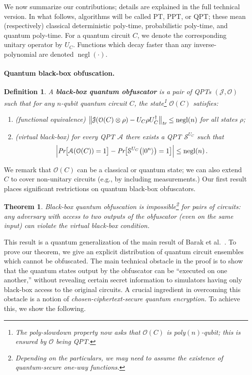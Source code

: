 \documentclass[11pt]{article}
\numberwithin{equation}{section}
\newtheorem{theorem}{Theorem}
\newtheorem{definition}{Definition}
\newcommand{\opn}{\operatorname}
\newcommand{\algo}{\mathcal}
\newcommand{\negl}{\opn{negl}}
\begin{document}
{We now summarize our contributions; details are explained in the full technical version. In what follows, algorithms will be called PT, PPT, or QPT; these mean (respectively) classical deterministic poly-time, probabilistic poly-time, and quantum poly-time. For a quantum circuit $C$, we denote the corresponding unitary operator by $U_C$. Functions which decay faster than any inverse-polynomial are denoted $\negl(\cdot)$.

\paragraph{Quantum black-box obfuscation.} 

\begin{definition}\label{def:vbb-obfuscator}
A \textbf{black-box quantum obfuscator} is a pair of QPTs $(\algo J, \algo O)$ such that for any $n$-qubit quantum circuit $C$, the state\footnote{The poly-slowdown property now asks that $\mathcal O(C)$ is poly$(n)$-qubit; this is ensured by $\algo O$ being QPT.} $\mathcal O(C)$ satisfies:
\begin{enumerate}
\item (functional equivalence) $\bigl\| \algo J ( \algo O(C) \otimes \rho ) - U_C \rho U_C^\dagger \bigr\|_\emph{tr} \leq \negl(n)$ for all states $\rho$;
\item (virtual black-box) for every QPT $\mathcal A$ there exists a QPT $\mathcal S^{U_C}$ such that
$$
\Bigl| \emph{Pr}\bigl[\mathcal A(\mathcal O(C)) = 1\bigr] - \emph{Pr}\bigl[\mathcal S^{U_C}\bigl(\ket{0^n}\bigr) = 1\bigr] \Bigr| \leq \negl(n)\,.
$$
\end{enumerate}
\end{definition}
\noindent We remark that $\algo O(C)$ can be a classical or quantum state; we can also extend $C$ to cover non-unitary circuits (e.g., by including measurements.) Our first result places significant restrictions on quantum black-box obfuscators.

\begin{theorem}\label{thm:main}
Black-box quantum obfuscation is impossible\footnote{Depending on the particulars, we may need to assume the existence of quantum-secure one-way functions.} for pairs of circuits: any adversary with access to two outputs of the obfuscator (even on the same input) can violate the virtual black-box condition.
\end{theorem}

\noindent This result is a quantum generalization of the main result of Barak et al.~\cite{BGIRSVY01}. To prove our theorem, we give an explicit distribution of quantum circuit ensembles which cannot be obfuscated. The main technical obstacle in the proof is to show that the quantum states output by the obfuscator can be ``executed on one another,'' without revealing certain secret information to simulators having only black-box access to the original circuits. A crucial ingredient in overcoming this obstacle is a notion of \emph{chosen-ciphertext-secure quantum encryption.} To achieve this, we show the following.

}
\end{document}

